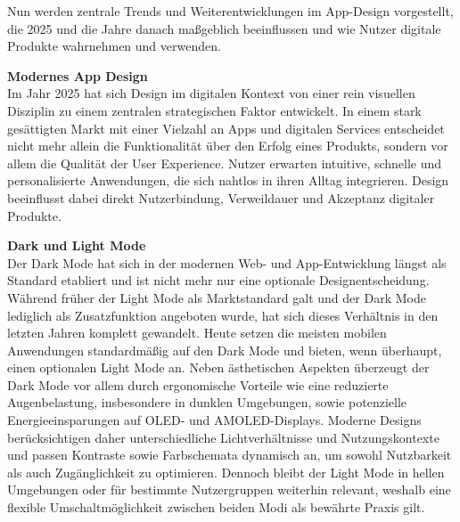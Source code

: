 Nun werden zentrale Trends und Weiterentwicklungen im App-Design vorgestellt, die 2025 und die Jahre danach maßgeblich beeinflussen und wie Nutzer digitale Produkte wahrnehmen und verwenden.
\vspace{0.5em}

\textbf{Modernes App Design}\\
Im Jahr 2025 hat sich Design im digitalen Kontext von einer rein visuellen Disziplin zu einem zentralen strategischen 
Faktor entwickelt. In einem stark gesättigten Markt mit einer Vielzahl an Apps und digitalen Services entscheidet nicht 
mehr allein die Funktionalität über den Erfolg eines Produkts, sondern vor allem die Qualität der User Experience. 
Nutzer erwarten intuitive, schnelle und personalisierte Anwendungen, die sich nahtlos in ihren Alltag integrieren. 
Design beeinflusst dabei direkt Nutzerbindung, Verweildauer und Akzeptanz digitaler Produkte.

\vspace{0.5em}
\textbf{Dark und Light Mode}\\
Der Dark Mode hat sich in der modernen Web- und App-Entwicklung längst als Standard etabliert und ist nicht mehr nur eine 
optionale Designentscheidung. Während früher der Light Mode als Marktstandard galt und der Dark Mode lediglich als Zusatzfunktion 
angeboten wurde, hat sich dieses Verhältnis in den letzten Jahren komplett gewandelt. Heute setzen die meisten mobilen Anwendungen 
standardmäßig auf den Dark Mode und bieten, wenn überhaupt, einen optionalen Light Mode an. Neben ästhetischen Aspekten überzeugt 
der Dark Mode vor allem durch ergonomische Vorteile wie eine reduzierte Augenbelastung, insbesondere in dunklen Umgebungen, sowie 
potenzielle Energieeinsparungen auf OLED- und AMOLED-Displays. Moderne Designs berücksichtigen daher unterschiedliche Lichtverhältnisse 
und Nutzungskontexte und passen Kontraste sowie Farbschemata dynamisch an, um sowohl Nutzbarkeit als auch Zugänglichkeit zu optimieren. 
Dennoch bleibt der Light Mode in hellen Umgebungen oder für bestimmte Nutzergruppen weiterhin relevant, weshalb eine flexible Umschaltmöglichkeit 
zwischen beiden Modi als bewährte Praxis gilt.\cite{Publizer_dark_mode_light_mode} \cite{natively_mobile_app_design_trends_2025}


